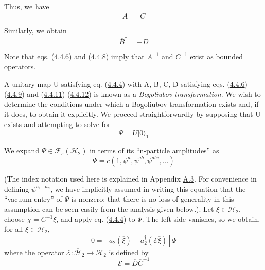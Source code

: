 \documentclass[11pt,a4paper]{article}
\begin{document}
Thus, we have
\begin{equation*}
A^{\dagger} = C \tag{4.4.11}\label{eq:4.4.11}
\end{equation*}

Similarly, we obtain
\begin{equation*}
\overline{B}^\dagger = -D \tag{4.4.12}\label{eq:4.4.12}
\end{equation*}

Note that eqs. (\hyperref[eq:4.4.6]{4.4.6}) and (\hyperref[eq:4.4.8]{4.4.8}) imply that \(A^{-1}\) and \(C^{-1}\) exist as bounded operators.

A unitary map U satisfying eq. (\hyperref[eq:4.4.4]{4.4.4}) with A, B, C, D satisfying eqs. (\hyperref[eq:4.4.6]{4.4.6})-(\hyperref[eq:4.4.9]{4.4.9}) and (\hyperref[eq:4.4.11]{4.4.11})-(\hyperref[eq:4.4.12]{4.4.12}) is known as a \emph{Bogoliubov transformation}. We wish to determine the conditions under which a Bogoliubov transformation exists and, if it does, to obtain it explicitly. We proceed straightforwardly by supposing that U exists and attempting to solve for
\begin{equation*}
\Psi = U \lvert 0\rangle _1 \tag{4.4.13}\label{eq:4.4.13}
\end{equation*}

We expand \(\Psi \in \mathcal{F}_s(\mathcal{H}_2)\) in terms of its ``n-particle amplitudes'' as
\begin{equation*}
\Psi = c (1, \psi^a, \psi^{ab}, \psi^{abc}, ...) \tag{4.4.14}\label{eq:4.4.14}
\end{equation*}

(The index notation used here is explained in Appendix \hyperlink{sec:A.3}{A.3}. For convenience in defining \(\psi^{a_1...a_n}\), we have implicitly assumed in writing this equation that the ``vacuum entry'' of \(\Psi\) is nonzero; that there is no loss of generality in this assumption can be seen easily from the analysis given below.). Let \(\xi \in \mathcal{H}_2\), choose \(\chi = C^{-1}\xi\), and apply eq. (\hyperref[eq:4.4.4]{4.4.4}) to \(\Psi\). The left side vanishes, so we obtain, for all \(\xi \in \mathcal{H}_2\),
\begin{equation*}
0 = [a_2(\overline{\xi}) - a_2^{\dagger}(\mathcal{E}\overline{\xi})] \Psi \tag{4.4.15}\label{eq:4.4.15}
\end{equation*} \hypertarget{source-83}{} where the operator \(\mathcal{E}: \overline{\mathcal{H}}_2 \rightarrow \mathcal{H}_2\) is defined by
\begin{equation*}
\mathcal{E} = \overline{D} \overline{C}^{-1} \tag{4.4.16}\label{eq:4.4.16}
\end{equation*}
\end{document}
